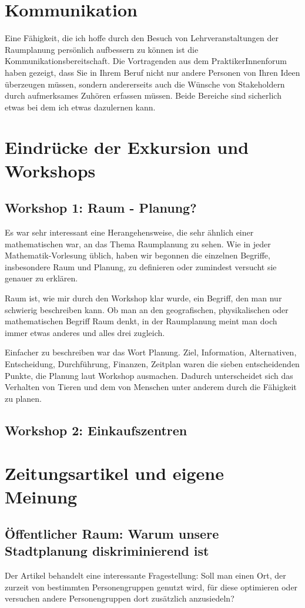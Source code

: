 \documentclass[]{article}
\begin{document}
\section{Kommunikation}
Eine Fähigkeit, die ich hoffe durch den Besuch von Lehrveranstaltungen der Raumplanung persönlich aufbessern zu können ist die Kommunikationsbereitschaft. Die Vortragenden aus dem PraktikerInnenforum haben gezeigt, dass Sie in Ihrem Beruf nicht nur andere Personen von Ihren Ideen überzeugen müssen, sondern andererseits auch die Wünsche von Stakeholdern durch aufmerksames Zuhören erfassen müssen. Beide Bereiche sind sicherlich etwas bei dem ich etwas dazulernen kann.

\section{Eindrücke der Exkursion und Workshops}
\subsection{Workshop 1: Raum - Planung?}
Es war sehr interessant eine Herangehensweise, die sehr ähnlich einer mathematischen war, an das Thema Raumplanung zu sehen. Wie in jeder Mathematik-Vorlesung üblich, haben wir begonnen die einzelnen Begriffe, insbesondere Raum und Planung, zu definieren oder zumindest versucht sie genauer zu erklären.

Raum ist, wie mir durch den Workshop klar wurde, ein Begriff, den man nur schwierig beschreiben kann. Ob man an den geografischen, physikalischen oder mathematischen Begriff Raum denkt, in der Raumplanung meint man doch immer etwas anderes und alles drei zugleich.

Einfacher zu beschreiben war das Wort Planung. Ziel, Information, Alternativen, Entscheidung, Durchführung, Finanzen, Zeitplan waren die sieben entscheidenden Punkte, die Planung laut Workshop ausmachen. Dadurch unterscheidet sich das Verhalten von Tieren und dem von Menschen unter anderem durch die Fähigkeit zu planen.

\subsection{Workshop 2: Einkaufszentren}


\section{Zeitungsartikel und eigene Meinung}
\subsection{Öffentlicher Raum: Warum unsere Stadtplanung diskriminierend ist}
Der Artikel behandelt eine interessante Fragestellung: Soll man einen Ort, der zurzeit von bestimmten Personengruppen genutzt wird, für diese optimieren oder versuchen andere Personengruppen dort zusätzlich anzusiedeln?
\end{document}
